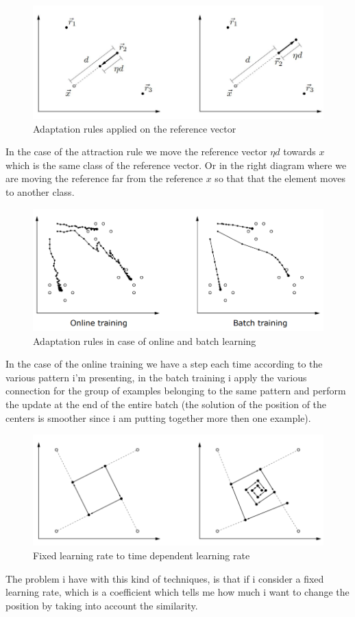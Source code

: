 \documentclass{article}
\begin{document}
\begin{figure}[H]
    \centering
    \includegraphics[scale=0.5]{images/adapt_rulesa.png}
    \caption{Adaptation rules applied on the reference vector}
\end{figure}
In the case of the attraction rule we move the reference vector $\eta d$ towards $x$
which is the same class of the reference vector. Or in the right diagram where
we are moving the reference far from the reference $x$ so that that the element
moves to another class.
\begin{figure}[H]
    \centering
    \includegraphics[scale=0.5]{images/onlk_batch_adap.png}
    \caption{Adaptation rules in case of online and batch learning}
\end{figure}
In the case of the online training we have a step each time according to the various
pattern i'm presenting, in the batch training i apply the various
connection for the group of examples belonging to the same pattern and perform the update at the end
of the entire batch (the solution of the position of the centers is smoother
since i am putting together more then one example).

\begin{figure}[H]
    \centering
    \includegraphics[scale=0.5]{images/time_dep_lm.png}
    \caption{Fixed learning rate to time dependent learning rate}
    \label{fig:tdln}
\end{figure}
The problem i have with this kind of techniques, is that if i consider a fixed learning rate,
which is a coefficient which tells me how much i want to change the position by taking
into account the similarity.
\end{document}

